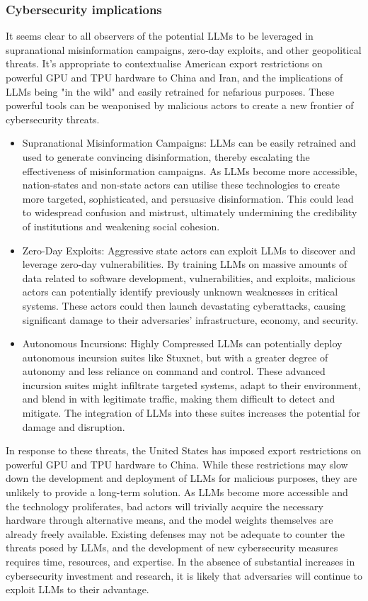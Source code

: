 \subsubsection{Cybersecurity implications}
It seems clear to all observers of the potential LLMs to be leveraged in supranational misinformation campaigns, zero-day exploits, and other geopolitical threats. It's appropriate to contextualise American export restrictions on powerful GPU and TPU hardware to China and Iran, and the implications of LLMs being "in the wild" and easily retrained for nefarious purposes. These powerful tools can be weaponised by malicious actors to create a new frontier of cybersecurity threats. 
\begin{itemize}
\item Supranational Misinformation Campaigns: 
LLMs can be easily retrained and used to generate convincing disinformation, thereby escalating the effectiveness of misinformation campaigns. As LLMs become more accessible, nation-states and non-state actors can utilise these technologies to create more targeted, sophisticated, and persuasive disinformation. This could lead to widespread confusion and mistrust, ultimately undermining the credibility of institutions and weakening social cohesion.
\item Zero-Day Exploits: 
Aggressive state actors can exploit LLMs to discover and leverage zero-day vulnerabilities. By training LLMs on massive amounts of data related to software development, vulnerabilities, and exploits, malicious actors can potentially identify previously unknown weaknesses in critical systems. These actors could then launch devastating cyberattacks, causing significant damage to their adversaries' infrastructure, economy, and security.
\item Autonomous Incursions:  Highly Compressed LLMs can potentially deploy autonomous incursion suites like Stuxnet, but with a greater degree of autonomy and less reliance on command and control. These advanced incursion suites might infiltrate targeted systems, adapt to their environment, and blend in with legitimate traffic, making them difficult to detect and mitigate. The integration of LLMs into these suites increases the potential for damage and disruption.
\end{itemize}
In response to these threats, the United States has imposed export restrictions on powerful GPU and TPU hardware to China. While these restrictions may slow down the development and deployment of LLMs for malicious purposes, they are unlikely to provide a long-term solution. As LLMs become more accessible and the technology proliferates, bad actors will trivially acquire the necessary hardware through alternative means, and the model weights themselves are already freely available. Existing defenses may not be adequate to counter the threats posed by LLMs, and the development of new cybersecurity measures requires time, resources, and expertise. In the absence of substantial increases in cybersecurity investment and research, it is likely that adversaries will continue to exploit LLMs to their advantage.\par
